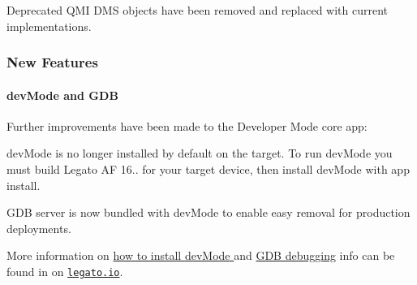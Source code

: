 Deprecated Q\+MI D\+MS objects have been removed and replaced with current implementations.\hypertarget{releaseNotes16104_rn16_10_4_Features}{}\subsubsection{New Features}\label{releaseNotes16104_rn16_10_4_Features}
\hypertarget{releaseNotes16104_rn16_10_4_devModeGDB}{}\paragraph{dev\+Mode and G\+DB}\label{releaseNotes16104_rn16_10_4_devModeGDB}
Further improvements have been made to the Developer Mode core app\+:
\begin{DoxyItemize}
\item {\ttfamily dev\+Mode} is no longer installed by default on the target. To run {\ttfamily dev\+Mode} you must build Legato AF 16.. for your target device, then install {\ttfamily dev\+Mode} with {\ttfamily app} {\ttfamily install}.
\item G\+DB server is now bundled with {\ttfamily dev\+Mode} to enable easy removal for production deployments.
\end{DoxyItemize}

More information on \hyperlink{basicTargetDevMode}{how to install {\ttfamily dev\+Mode} }and \hyperlink{howToDebugGDB}{G\+DB debugging} info can be found in on \href{http://legato.io}{\tt legato.\+io}.

